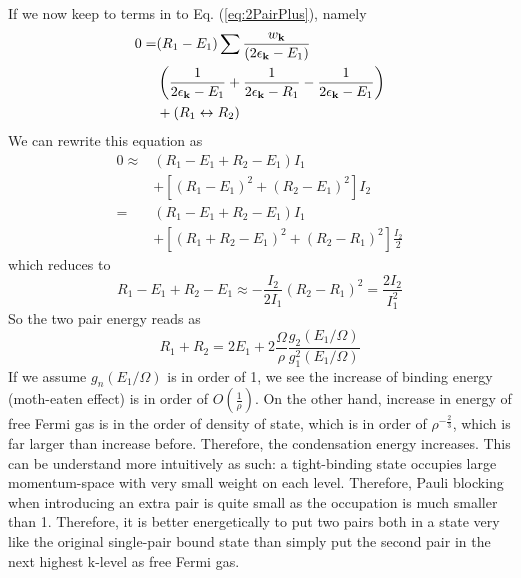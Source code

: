 \documentclass[aps,prb,showpacs,reprint]{revtex4-1}
\begin{document}

If we now keep to terms in to Eq. (\ref{eq:2PairPlus}), namely
\begin{equation}
\begin{split}
0=&(R_1-E_1)\sum{\frac{w_{\ensuremath{\mathbf{k}}}}{(2\epsilon_{\ensuremath{\mathbf{k}}}-E_1)}}\\
&\left(\frac{1}{2\epsilon_{\mathbf{k}}-E_1}+\frac{1}{2\epsilon_{\mathbf{k}}-R_1}-\frac{1}{2\epsilon_{\mathbf{k}}-E_1}\right)\\
&+(R_1\leftrightarrow{}R_2)
\end{split}
\end{equation}
We can rewrite this equation as
\begin{equation}
\begin{split}
0\approx&(R_1-E_1+R_2-E_1)I_1\\
&+\left[(R_1-E_1)^2+(R_2-E_1)^2\right]I_2\\
=&(R_1-E_1+R_2-E_1)I_1\\
&+\left[(R_1+R_2-E_1)^2+(R_2-R_1)^2\right]\frac{I_2}{2}
\end{split}
\label{eq:}
\end{equation}
which reduces  to 
\begin{equation}
R_1-E_1+R_2-E_1\approx-\frac{I_2}{2I_1}(R_2-R_1)^2=\frac{2I_2}{I_1^2}
\label{eq:}
\end{equation}
So the two pair energy reads as
\begin{equation}
R_1+R_2=2E_1+2\frac{\Omega}{\rho}\frac{g_2(E_1/\Omega)}{g_1^2(E_1/\Omega)}
\label{eq:}
\end{equation}
If we assume $g_n(E_1/\Omega)$ is in order of 1, we see the increase of binding energy (moth-eaten effect) is in order of $O(\frac{1}{\rho})$.  On the other hand, increase in energy of free Fermi gas is in the order of density of state, which is in order of $\rho^{-\frac{2}{3}}$, which is far larger than increase before.  Therefore, the condensation energy increases. This can be understand more intuitively as such: a tight-binding state occupies large momentum-space with very small weight on each level. Therefore, Pauli blocking when introducing an extra pair is quite small as the occupation is much smaller than 1. Therefore, it is better energetically to put two pairs both in a state very like the original single-pair bound state than simply put the second pair in the next highest k-level as free Fermi gas.   
\end{document}
